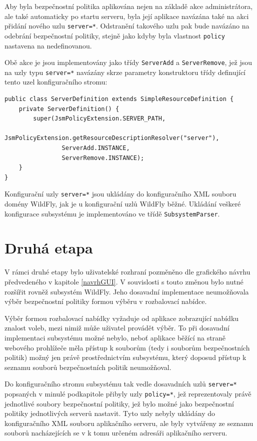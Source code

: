 Aby byla bezpečnostní politika aplikována nejen na základě akce administrátora, ale také automaticky po startu serveru, byla její aplikace navázána také na akci přidání nového uzlu {\tt server=*}. Odstranění takového uzlu pak bude navázáno na odebrání bezpečnostní politiky, stejně jako kdyby byla vlastnost {\tt policy} nastavena na nedefinovanou.

Obě akce je jsou implementovány jako třídy {\tt ServerAdd} a {\tt ServerRemove}, jež jsou na uzly typu {\tt server=*} navázány skrze parametry konstruktoru třídy definující tento uzel konfiguračního stromu:

\begin{verbatim}
public class ServerDefinition extends SimpleResourceDefinition {
    private ServerDefinition() {
        super(JsmPolicyExtension.SERVER_PATH,
                JsmPolicyExtension.getResourceDescriptionResolver("server"),
                ServerAdd.INSTANCE,
                ServerRemove.INSTANCE);
    }
}
\end{verbatim}

Konfigurační uzly {\tt server=*} jsou ukládány do konfiguračního XML souboru domény WildFly, jak je u konfigurační uzlů WildFly běžné. Ukládání veškeré konfigurace subsystému je implementováno ve třídě {\tt SubsystemParser}.

\section{Druhá etapa}

V rámci druhé etapy bylo uživatelské rozhraní pozměněno dle grafického návrhu předvedeného v kapitole \ref{navrhGUI}. V souvislosti s touto změnou bylo nutné rozšířit rovněž subsystém WildFly. Jeho dosavadní implementace neumožňovala výběr bezpečnostní politiky formou výběru v rozbalovací nabídce.

Výběr formou rozbalovací nabídky vyžaduje od aplikace zobrazující nabídku znalost voleb, mezi nimiž může uživatel provádět výběr. To při dosavadní implementaci subsystému možné nebylo, neboť aplikace běžící na straně webového prohlížeče měla přístup k souborům (tedy i souborům bezpečnostních politik) možný jen právě prostřednictvím subsystému, který doposud přístup k seznamu souborů bezpečnostních politik neumožňoval.

Do konfiguračního stromu subsystému tak vedle dosavadních uzlů {\tt server=*} popsaných v minulé podkapitole přibyly uzly {\tt policy=*}, jež reprezentovaly právě jednotlivé soubory bezpečnostní politiky, jež bylo možné jako bezpečnostní politiky jednotlivých serverů nastavit. Tyto uzly nebyly ukládány do konfiguračního XML souboru aplikačního serveru, ale byly vytvářeny ze seznamu souborů nacházejících se v k tomu určeném adresáři aplikačního serveru.

